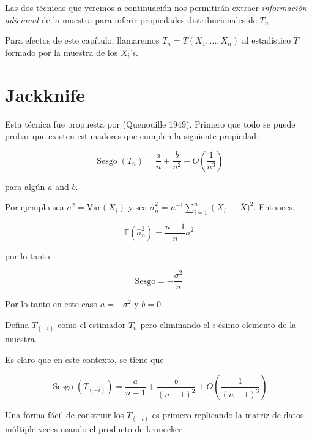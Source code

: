 \documentclass[
  12pt,
]{book}
\begin{document}
Las dos técnicas que veremos a continuación nos permitirán extraer
\emph{información adicional} de la muestra para inferir propiedades
distribucionales de \(T_n\).

Para efectos de este capítulo, llamaremos
\(T_{n}=T\left(  X_{1},\ldots,X_{n}\right)\) al estadístico \(T\)
formado por la muestra de los \(X_{i}\)'s.

\hypertarget{jackknife}{%
\section{Jackknife}\label{jackknife}}

Esta técnica fue propuesta por (Quenouille 1949). Primero que todo se
puede probar que existen estimadores que cumplen la siguiente propiedad:

\begin{equation}
\operatorname{Sesgo}\left(T_{n}\right)=\frac{a}{n}+\frac{b}{n^{2}}+O\left(\frac{1}{n^{3}}\right)
\end{equation}

para algún \(a\) and \(b\).

Por ejemplo sea \(\sigma^{2}=\mathrm{Var}\left(X_{i}\right)\) y sea
\(\widehat{\sigma}_{n}^{2}=n^{-1} \sum_{i=1}^{n}\left(X_{i}-\right.\)
\(\bar{X})^{2}\). Entonces,

\begin{equation*}
\mathbb{E}\left(\widehat{\sigma}_{n}^{2}\right)=
\frac{n-1}{n}\sigma^{2}
\end{equation*}

por lo tanto

\begin{equation*}
\mathrm{Sesgo} = -\frac{\sigma^{2}}{n}
\end{equation*}

Por lo tanto en este caso \(a=-\sigma^{2}\) y \(b=0\).

Defina \(T_{(-i)}\) como el estimador \(T_{n}\) pero eliminando el
\(i\)-ésimo elemento de la muestra.

Es claro que en este contexto, se tiene que

\begin{equation}
\operatorname{Sesgo}\left(T_{(-i)}\right)=\frac{a}{n-1}+\frac{b}{(n-1)^{2}}+O\left(\frac{1}{(n-1)^{3}}\right)
\end{equation}

\leavevmode{}%
Una forma fácil de construir los \(T_{(-i)}\) es primero replicando la
matriz de datos múltiple veces usando el producto de kronecker
\end{document}
